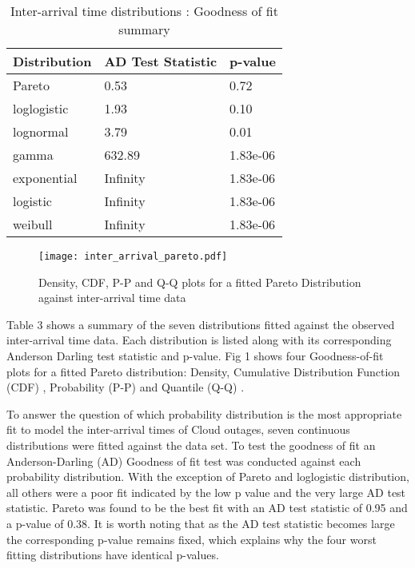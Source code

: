 \documentclass[5p]{elsarticle}
\begin{document}
\begin {table}
\caption {Inter-arrival time distributions :  Goodness of fit summary} 
\begin{center}
\begin{tabular}{p{2.1cm} |  p{3.1cm} | p{1.3cm}} \hline \bf{Distribution} & \bf{AD Test Statistic} & \bf{p-value}
\\ \hline Pareto & 0.53 & 0.72 
\\ loglogistic & 1.93 & 0.10
\\ lognormal & 3.79 & 0.01
\\ gamma & 632.89 & 1.83e-06	
\\ exponential & Infinity  & 1.83e-06
\\ logistic & Infinity & 1.83e-06	
\\ weibull  & Infinity & 1.83e-06 
\\ \hline
\end{tabular}
\end{center}
\end{table}

\begin{figure*}[]
\begin{center}
\texttt{[image: inter\_arrival\_pareto.pdf]} 
\caption{Density, CDF, P-P and Q-Q plots for a fitted Pareto Distribution against inter-arrival time data}
\end{center}
\label{fig:outagedistribution}
\end{figure*}

Table 3 shows a summary of the seven distributions fitted against the observed inter-arrival time data. Each distribution is listed along with its corresponding Anderson Darling test statistic and p-value. Fig 1 shows four Goodness-of-fit plots for a fitted Pareto distribution: Density, Cumulative Distribution Function (CDF) , Probability (P-P) \cite{gibbons2011nonparametric}  and Quantile (Q-Q) \cite{wilk1968probability}.  

To answer the question of which probability distribution is the most appropriate fit to model the inter-arrival times of Cloud outages, seven continuous distributions were fitted against the data set. To test the goodness of fit an Anderson-Darling (AD) Goodness of fit test was conducted against each probability distribution. With the exception of Pareto and loglogistic distribution, all others were a poor fit indicated by the low p value and the very large AD test statistic. Pareto was found to be the best fit with an AD test statistic of 0.95 and a p-value of 0.38. It is worth noting that as the AD test statistic becomes large the corresponding p-value remains fixed, which explains why the four worst fitting distributions have identical p-values.
\end{document}
